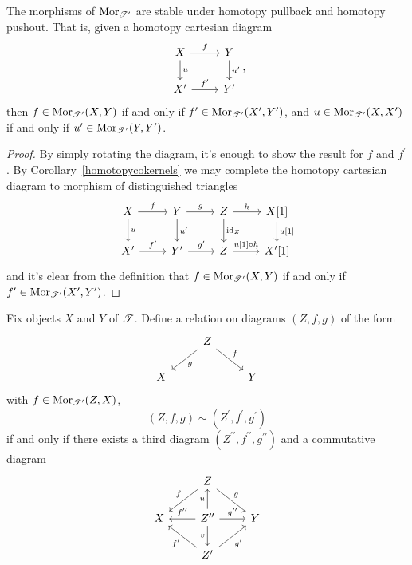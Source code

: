 \documentclass[dissertation.tex]{subfiles}
\begin{document}
\begin{prop}[\cite{NeemanTCats}]
  The morphisms of $\operatorname{Mor}_{\mathscr{T}^\prime}$ are stable under homotopy pullback and homotopy pushout.
  That is, given a homotopy cartesian diagram
  $$\begin{tikzcd}
    X \arrow{r}{f}\arrow{d}{u} & Y \arrow{d}{u^\prime}\\
    X^\prime \arrow{r}{f^\prime} & Y^\prime
  \end{tikzcd},$$
  then 
  $f \in \operatorname{Mor}_{\mathscr{T}^\prime}(X,Y)$ 
  if and only if 
  $f^\prime \in \operatorname{Mor}_{\mathscr{T}^\prime}(X^\prime, Y^\prime)$, and
  $u \in \operatorname{Mor}_{\mathscr{T}^\prime}(X,X^\prime)$ 
  if and only if
  $u^\prime \in \operatorname{Mor}_{\mathscr{T}^\prime}(Y,Y^\prime)$.
  
  \begin{proof}
    By simply rotating the diagram, it's enough to show the result for $f$ and $f^\prime$.
    By Corollary~\ref{homotopycokernels} we may complete the homotopy cartesian diagram to morphism of distinguished triangles
    $$\begin{tikzcd}
      X \arrow{r}{f}\arrow{d}{u} & Y \arrow{r}{g}\arrow{d}{u^\prime} & Z \arrow{r}{h}\arrow{d}{\id_Z} & X[1]\arrow{d}{u[1]}\\
      X^\prime \arrow{r}{f^\prime} & Y^\prime \arrow{r}{g^\prime} & Z \arrow{r}{u[1] \circ h} & X^\prime[1]
    \end{tikzcd}$$
    and it's clear from the definition that $f \in \operatorname{Mor}_{\mathscr{T}^\prime}(X,Y)$ if and only if $f^\prime \in \operatorname{Mor}_{\mathscr{T}^\prime}(X^\prime, Y^\prime)$.
  \end{proof}
\end{prop}

\begin{defn}[\cite{NeemanTCats}]
  Fix objects $X$ and $Y$ of $\mathscr{T}$.
  Define a relation on diagrams $(Z,f,g)$ of the form 
  $$\begin{tikzcd}
    & Z\arrow{rd}{f}\arrow{ld}{g}\\
    X & & Y
  \end{tikzcd}$$
  with $f \in \operatorname{Mor}_{\mathscr{T}^\prime}(Z,X)$,
  $$(Z,f,g) \sim (Z^\prime, f^\prime, g^\prime)$$
  if and only if there exists a third diagram $(Z^{\prime\prime}, f^{\prime\prime}, g^{\prime\prime})$ and a commutative diagram
  $$\begin{tikzcd}
    & Z\arrow[swap]{ld}{f}\arrow{rd}{g}\\
    X & Z^{\prime\prime} \arrow[swap]{l}{f^{\prime\prime}}\arrow{r}{g^{\prime\prime}}\arrow{u}{u}\arrow[swap]{d}{v} & Y\\
    & Z^\prime\arrow{ul}{f^\prime}\arrow[swap]{ur}{g^\prime}
  \end{tikzcd}$$
\end{defn}
\end{document}
